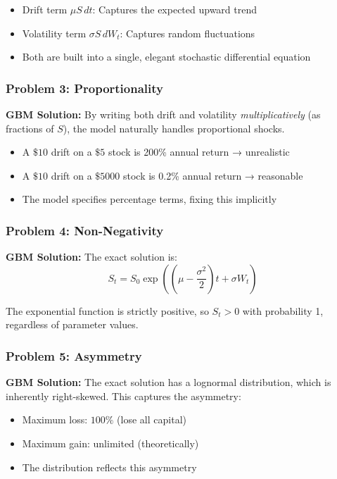 \documentclass[12pt,a4paper]{article}
\begin{document}
\begin{itemize}
    \item Drift term $\mu S \, dt$: Captures the expected upward trend
    \item Volatility term $\sigma S \, dW_t$: Captures random fluctuations
    \item Both are built into a single, elegant stochastic differential equation
\end{itemize}

\subsubsection{Problem 3: Proportionality}

\textbf{GBM Solution:} By writing both drift and volatility \textit{multiplicatively} (as fractions of $S$), the model naturally handles proportional shocks.
\begin{itemize}
    \item A $\$10$ drift on a $\$5$ stock is 200\% annual return → unrealistic
    \item A $\$10$ drift on a $\$5000$ stock is 0.2\% annual return → reasonable
    \item The model specifies percentage terms, fixing this implicitly
\end{itemize}

\subsubsection{Problem 4: Non-Negativity}

\textbf{GBM Solution:} The exact solution is:
\begin{equation}
S_t = S_0 \exp\left(\left(\mu - \frac{\sigma^2}{2}\right)t + \sigma W_t\right)
\end{equation}

The exponential function is strictly positive, so $S_t > 0$ with probability 1, regardless of parameter values.

\subsubsection{Problem 5: Asymmetry}

\textbf{GBM Solution:} The exact solution has a lognormal distribution, which is inherently right-skewed. This captures the asymmetry:
\begin{itemize}
    \item Maximum loss: $100\%$ (lose all capital)
    \item Maximum gain: unlimited (theoretically)
    \item The distribution reflects this asymmetry
\end{itemize}
\end{document}
